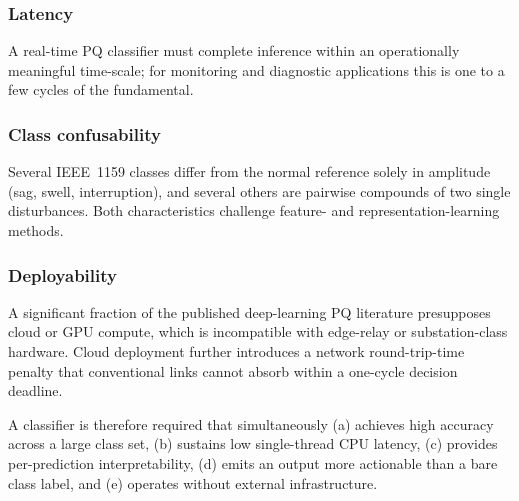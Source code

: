 \documentclass[conference]{IEEEtran}
\begin{document}
\subsubsection{Latency} A real-time PQ classifier must complete
inference within an operationally meaningful time-scale; for monitoring
and diagnostic applications this is one to a few cycles of the
fundamental.

\subsubsection{Class confusability} Several IEEE~1159 classes differ
from the normal reference solely in amplitude (sag, swell,
interruption), and several others are pairwise compounds of two single
disturbances. Both characteristics challenge feature- and
representation-learning methods.

\subsubsection{Deployability} A significant fraction of the published
deep-learning PQ literature presupposes cloud or GPU compute, which is
incompatible with edge-relay or substation-class hardware. Cloud
deployment further introduces a network round-trip-time penalty that
conventional links cannot absorb within a one-cycle decision deadline.

A classifier is therefore required that simultaneously (a) achieves
high accuracy across a large class set, (b) sustains low single-thread
CPU latency, (c) provides per-prediction interpretability, (d) emits
an output more actionable than a bare class label, and (e) operates
without external infrastructure.
\end{document}
